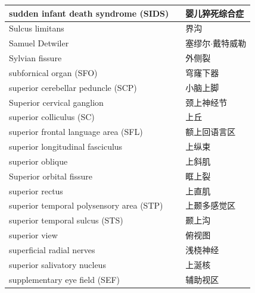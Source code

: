 \begin{longtable}{lll}
	\midrule
	sudden infant death syndrome (SIDS)  && 婴儿猝死综合症 \\
	
	\midrule
	Sulcus limitans   && 界沟 \\
	
	\midrule
	Samuel Detwiler   && 塞缪尔$\cdot$戴特威勒 \\
	
	\midrule
	Sylvian fissure   && 外侧裂 \\
	
	\midrule
	subfornical organ (SFO)  && 穹窿下器 \\
	
	\midrule
	superior cerebellar peduncle (SCP)  && 小脑上脚 \\
	
	\midrule
	Superior cervical ganglion   && 颈上神经节 \\
	
	\midrule
	superior colliculus (SC)  && 上丘 \\
	
	\midrule
	superior frontal language area (SFL) && 额上回语言区 \\
	
	\midrule
	superior longitudinal fasciculus   && 上纵束 \\
	
	\midrule
	superior oblique   && 上斜肌 \\
	
	\midrule
	Superior orbital fissure   && 眶上裂 \\
	
	\midrule
	superior rectus   && 上直肌 \\
	
	\midrule
	superior temporal polysensory area (STP)   && 上颞多感觉区 \\
	
	\midrule
	superior temporal sulcus (STS)   && 颞上沟 \\
	
	\midrule
	superior view   && 俯视图 \\
	
	\midrule
	superficial radial nerves   && 浅桡神经 \\
	
	\midrule
	superior salivatory nucleus   && 上涎核 \\
	
	\midrule
	supplementary eye field (SEF)   && 辅助视区 \\
	

\end{longtable}
